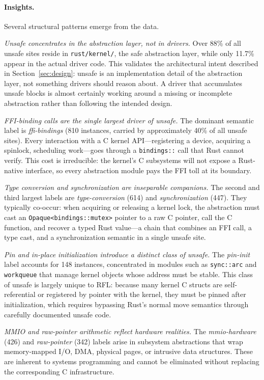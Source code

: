 \paragraph{Insights.}
Several structural patterns emerge from the data.

\textit{Unsafe concentrates in the abstraction layer, not in drivers.}
Over 88\% of all unsafe sites reside in \texttt{rust/kernel/}, the safe abstraction layer, while only 11.7\% appear in the actual driver code.
This validates the architectural intent described in Section~\ref{sec:design}: unsafe is an implementation detail of the abstraction layer, not something drivers should reason about.
A driver that accumulates unsafe blocks is almost certainly working around a missing or incomplete abstraction rather than following the intended design.

\textit{FFI-binding calls are the single largest driver of unsafe.}
The dominant semantic label is \emph{ffi-bindings} (810 instances, carried by approximately 40\% of all unsafe sites).
Every interaction with a C kernel API---registering a device, acquiring a spinlock, scheduling work---goes through a \texttt{bindings::} call that Rust cannot verify.
This cost is irreducible: the kernel's C subsystems will not expose a Rust-native interface, so every abstraction module pays the FFI toll at its boundary.

\textit{Type conversion and synchronization are inseparable companions.}
The second and third largest labels are \emph{type-conversion} (614) and \emph{synchronization} (447).
They typically co-occur: when acquiring or releasing a kernel lock, the abstraction must cast an \texttt{Opaque<bindings::mutex>} pointer to a raw C pointer, call the C function, and recover a typed Rust value---a chain that combines an FFI call, a type cast, and a synchronization semantic in a single unsafe site.

\textit{Pin and in-place initialization introduce a distinct class of unsafe.}
The \emph{pin-init} label accounts for 148 instances, concentrated in modules such as \texttt{sync::arc} and \texttt{workqueue} that manage kernel objects whose address must be stable.
This class of unsafe is largely unique to RFL: because many kernel C structs are self-referential or registered by pointer with the kernel, they must be pinned after initialization, which requires bypassing Rust's normal move semantics through carefully documented unsafe code.

\textit{MMIO and raw-pointer arithmetic reflect hardware realities.}
The \emph{mmio-hardware} (426) and \emph{raw-pointer} (342) labels arise in subsystem abstractions that wrap memory-mapped I/O, DMA, physical pages, or intrusive data structures.
These are inherent to systems programming and cannot be eliminated without replacing the corresponding C infrastructure.

